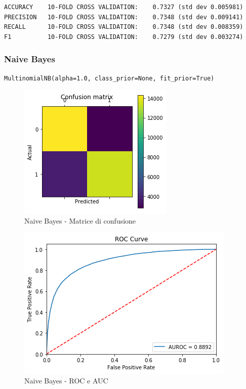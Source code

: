 \documentclass[hidelinks, 12pt]{article}
\begin{document}
\begin{verbatim}
ACCURACY    10-FOLD CROSS VALIDATION:    0.7327 (std dev 0.005981)
PRECISION   10-FOLD CROSS VALIDATION:    0.7348 (std dev 0.009141)
RECALL      10-FOLD CROSS VALIDATION:    0.7348 (std dev 0.008359)
F1          10-FOLD CROSS VALIDATION:    0.7279 (std dev 0.003274)
\end{verbatim}

\clearpage

\subsubsection{Naive Bayes}

\begin{verbatim}
MultinomialNB(alpha=1.0, class_prior=None, fit_prior=True)
\end{verbatim}

\begin{figure}[H]
	\centering
	\includegraphics[scale=0.6]{images/05_01_bayes_confmat.png}
	\caption[Naive Bayes - Matrice di confusione]{Naive Bayes - Matrice di confusione}
	\label{fig:bayes-cm}
\end{figure}

\begin{figure}[H]
	\centering
	\includegraphics[scale=0.6]{images/05_01_bayes_auroc.png}
	\caption[Naive Bayes - ROC e AUC]{Naive Bayes - ROC e AUC}
	\label{fig:bayes-auroc}
\end{figure}
\end{document}
